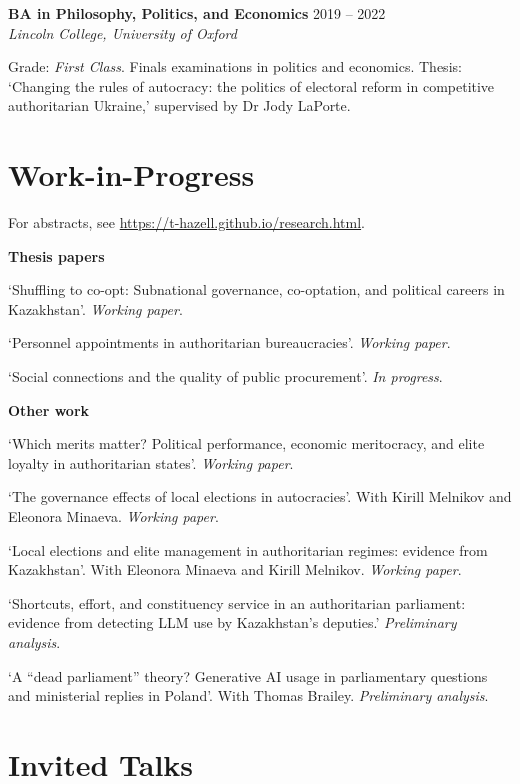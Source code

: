 \documentclass[11pt, a4paper]{article}
\begin{document}
\begin{samepage}
  \textbf{BA in Philosophy, Politics, and Economics} \hfill 2019 -- 2022\\
  \textit{Lincoln College, University of Oxford}

Grade: \textit{First Class}. Finals examinations in politics and economics. Thesis: `Changing the rules of autocracy: the politics of electoral reform in competitive authoritarian Ukraine,' supervised by Dr Jody LaPorte.
\end{samepage}

\section{Work-in-Progress}

For abstracts, see \url{https://t-hazell.github.io/research.html}.

\textbf{Thesis papers}

`Shuffling to co-opt: Subnational governance, co-optation, and political careers in Kazakhstan'. \textit{Working paper}.

`Personnel appointments in authoritarian bureaucracies'. \textit{Working paper}.

`Social connections and the quality of public procurement'. \textit{In progress}.

\textbf{Other work}

`Which merits matter? Political performance, economic meritocracy, and elite loyalty in authoritarian states'. \textit{Working paper}.

`The governance effects of local elections in autocracies'. With Kirill Melnikov and Eleonora Minaeva. \textit{Working paper}.

`Local elections and elite management in authoritarian regimes: evidence from Kazakhstan'. With Eleonora Minaeva and Kirill Melnikov.  \textit{Working paper}.

`Shortcuts, effort, and constituency service in an authoritarian parliament: evidence from detecting LLM use by Kazakhstan's deputies.' \textit{Preliminary analysis}.

`A ``dead parliament'' theory? Generative AI usage in parliamentary questions and ministerial replies in Poland'. With Thomas Brailey. \textit{Preliminary analysis}.

\section{Invited Talks}
\end{document}
